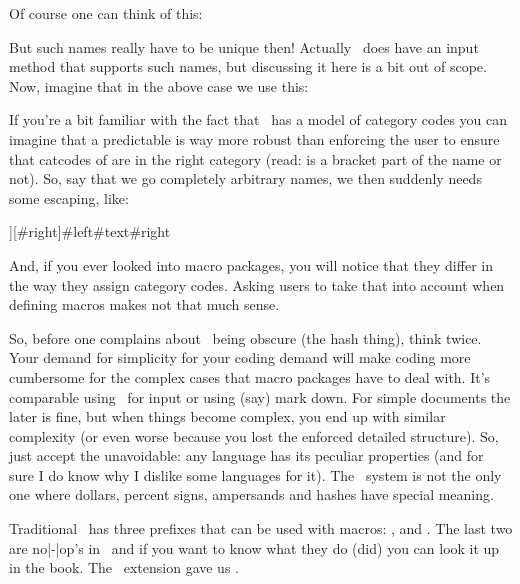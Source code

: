Of course one can think of this:

\starttyping[option=TEX]
\stoptyping

But such names really have to be unique then! Actually \CONTEXT\ does have an
input method that supports such names, but discussing it here is a bit out of
scope. Now, imagine that in the above case we use this:

\starttyping[option=TEX]
\stoptyping

If you're a bit familiar with the fact that \TEX\ has a model of category codes
you can imagine that a predictable  is way
more robust than enforcing the user to ensure that catcodes of  are
in the right category (read: is a bracket part of the name or not). So, say that
we go completely arbitrary names, we then suddenly needs some escaping, like:

\starttyping[option=TEX]
\def\foo[#{left}][#{right}]{\def\oof#{text}{#{left}#{text}#{right}}}
\stoptyping

And, if you ever looked into macro packages, you will notice that they differ in
the way they assign category codes. Asking users to take that into account when
defining macros makes not that much sense.

So, before one complains about \TEX\ being obscure (the hash thing), think twice.
Your demand for simplicity for your coding demand will make coding more
cumbersome for the complex cases that macro packages have to deal with. It's
comparable using \TEX\ for input or using (say) mark down. For simple documents
the later is fine, but when things become complex, you end up with similar
complexity (or even worse because you lost the enforced detailed structure). So,
just accept the unavoidable: any language has its peculiar properties (and for
sure I do know why I dislike some languages for it). The \TEX\ system is not the
only one where dollars, percent signs, ampersands and hashes have special
meaning.

\stopsection

\startsection[title=Prefixes]

Traditional \TEX\ has three prefixes that can be used with macros: \type {\global},
\type {\outer} and \type {\long}. The last two are no|-|op's in \LUAMETATEX\ and
if you want to know what they do (did) you can look it up in the \TEX book. The
\ETEX\ extension gave us \type {\protected}.

